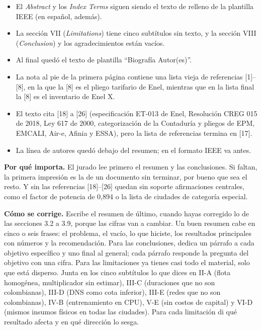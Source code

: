 \documentclass[11pt]{article}
\begin{document}
\begin{error}
\begin{itemize}[leftmargin=1.2em]
\item El \emph{Abstract} y los \emph{Index Terms} siguen siendo el texto de relleno de la plantilla IEEE (en español, además).
\item La sección VII (\emph{Limitations}) tiene cinco subtítulos sin texto, y la sección VIII (\emph{Conclusion}) y los agradecimientos están vacíos.
\item Al final quedó el texto de plantilla ``Biografía Autor(es)''.
\item La nota al pie de la primera página contiene una lista vieja de referencias [1]--[8], en la que la [8] es el pliego tarifario de Enel, mientras que en la lista final la [8] es el inventario de Enel X.
\item El texto cita [18] a [26] (especificación ET-013 de Enel, Resolución CREG 015 de 2018, Ley 617 de 2000, categorización de la Contaduría y pliegos de EPM, EMCALI, Air-e, Afinia y ESSA), pero la lista de referencias termina en [17].
\item La línea de autores quedó debajo del resumen; en el formato IEEE va antes.
\end{itemize}
\end{error}

\textbf{Por qué importa.} El jurado lee primero el resumen y las conclusiones. Si faltan, la primera impresión es la de un documento sin terminar, por bueno que sea el resto. Y sin las referencias [18]--[26] quedan sin soporte afirmaciones centrales, como el factor de potencia de 0,894 o la lista de ciudades de categoría especial.

\textbf{Cómo se corrige.} Escribe el resumen de último, cuando hayas corregido lo de las secciones 3.2 a 3.9, porque las cifras van a cambiar. Un buen resumen cabe en cinco o seis frases: el problema, el vacío, lo que hiciste, los resultados principales con números y la recomendación. Para las conclusiones, dedica un párrafo a cada objetivo específico y uno final al general; cada párrafo responde la pregunta del objetivo con una cifra. Para las limitaciones ya tienes casi todo el material, solo que está disperso. Junta en los cinco subtítulos lo que dices en II-A (flota homogénea, multiplicador sin estimar), III-C (duraciones que no son colombianas), III-D (DNS como cota inferior), III-E (redes que no son colombianas), IV-B (entrenamiento en CPU), V-E (sin costos de capital) y VI-D (mismos insumos físicos en todas las ciudades). Para cada limitación di qué resultado afecta y en qué dirección lo sesga.
\end{document}
